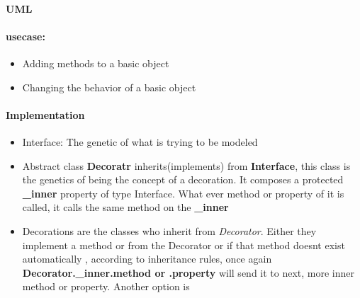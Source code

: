         \paragraph{UML}
            
        \paragraph{usecase:}
        \begin{itemize}
            \item Adding methods to a basic object
            \item Changing the behavior of a basic object
        \end{itemize}
        
        \paragraph{Implementation}
            \begin{itemize}
                    \item Interface: The genetic of what is trying to be modeled
                    \item Abstract class \textbf{Decoratr} inherits(implements) from \textbf{Interface}, this class is the genetics of being the concept of a decoration. It composes a protected \textbf{\_inner} property of type Interface. What ever method or property of it is called, it calls the same method on the \textbf{\_inner}
                    \item Decorations are the classes who inherit from \textit{Decorator}. Either they implement a method or from the Decorator or if that method doesnt exist automatically , according to inheritance rules, once again \textbf{Decorator.\_inner.method or .property} will send it to next, more inner method or property. Another option is
            \end{itemize}
        

